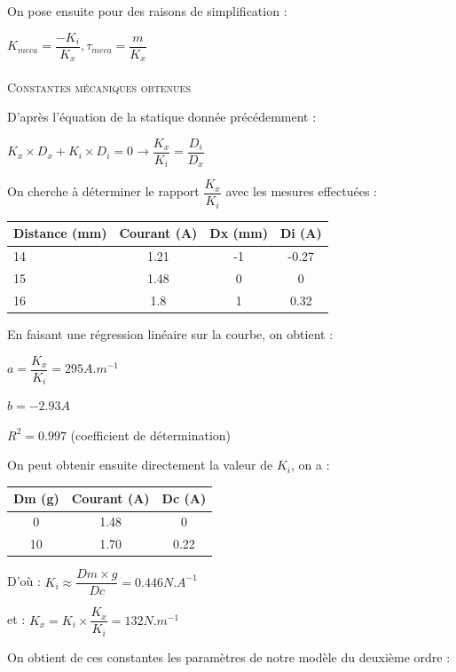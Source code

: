 \documentclass[11pt, french]{article} %
\begin{document}
\noindent
On pose ensuite pour des raisons de simplification :

 \medskip
$ K_{meca} = \dfrac{-K_i}{K_x}, \tau_{meca} = \dfrac{m}{K_x} $

\paragraph{}
\textsc{Constantes mécaniques obtenues}

\noindent
D'après l'équation de la statique donnée précédemment :

 \medskip
$ K_x \times D_x + K_i \times D_i = 0 \rightarrow \dfrac{K_x}{K_i} = \dfrac{D_i}{D_x} $
 \medskip

\noindent
On cherche à déterminer le rapport $ \dfrac{K_x}{K_i} $ avec les mesures effectuées :

\medskip
\begin{tabular} {|l|c|c|c|}
	 \hline
	\textbf{Distance (mm)} & \textbf{Courant (A)} & \textbf{Dx (mm)} & \textbf{Di (A)} \\ \hline
	14 & 1.21 &  -1 & -0.27 \\ \hline
	15 & 1.48 & 0 & 0 \\ \hline
	16 & 1.8 & 1 & 0.32 \\ \hline
\end{tabular}

\medskip
\noindent
En faisant une régression linéaire sur la courbe, on obtient :

\medskip
$ a = \dfrac{K_x}{K_i} = 295 A.m^{-1} $

\medskip
$ b = - 2.93 A $

\medskip
$ R^2 = 0.997 $ (coefficient de détermination)
\medskip

\noindent
On peut obtenir ensuite directement la valeur de $ K_i $, on a :

\medskip
\begin{tabular} {|c|c|c|}
	 \hline
	\textbf{Dm (g)} & \textbf{Courant (A)} & \textbf{Dc (A)} \\ \hline
	0 & 1.48 &  0 \\ \hline
	10 & 1.70 & 0.22 \\ \hline
\end{tabular}

\medskip
D'où : $ K_i \approx \dfrac{Dm \times g}{Dc} = 0.446 N.A^{-1} $

\medskip
et : $ K_x = K_i \times \dfrac{K_x}{K_i} = 132 N.m ^{-1} $

\medskip
\noindent
On obtient de ces constantes les paramètres de notre modèle du deuxième ordre :
\end{document}
